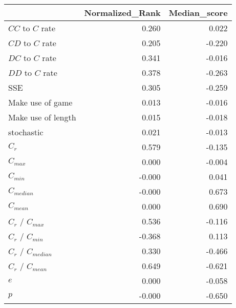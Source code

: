 \begin{tabular}{lrr}
\toprule
{} &  Normalized_Rank &  Median_score \\
\midrule
$CC$ to $C$ rate     &            0.260 &         0.022 \\
$CD$ to $C$ rate     &            0.205 &        -0.220 \\
$DC$ to $C$ rate     &            0.341 &        -0.016 \\
$DD$ to $C$ rate     &            0.378 &        -0.263 \\
SSE                  &            0.305 &        -0.259 \\
Make use of game     &            0.013 &        -0.016 \\
Make use of length   &            0.015 &        -0.018 \\
stochastic           &            0.021 &        -0.013 \\
$C_r$                &            0.579 &        -0.135 \\
$C_{max}$            &            0.000 &        -0.004 \\
$C_{min}$            &           -0.000 &         0.041 \\
$C_{median}$         &           -0.000 &         0.673 \\
$C_{mean}$           &            0.000 &         0.690 \\
$C_r$ / $C_{max}$    &            0.536 &        -0.116 \\
$C_r$ / $C_{min}$    &           -0.368 &         0.113 \\
$C_r$ / $C_{median}$ &            0.330 &        -0.466 \\
$C_r$ / $C_{mean}$   &            0.649 &        -0.621 \\
$e$                  &            0.000 &        -0.058 \\
$p$                  &           -0.000 &        -0.650 \\
\bottomrule
\end{tabular}
